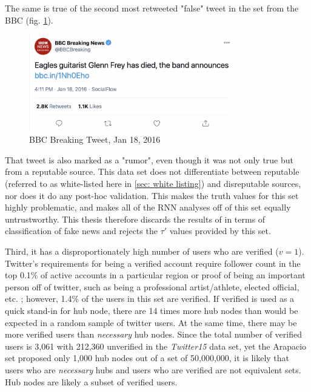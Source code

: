 \documentclass[preprint,review,12pt]{elsarticle}
\begin{document}
The same is true of the second most retweeted "false" tweet in the set from the BBC (fig. \ref{fig:BBC Breaking Tweet, Jan 18, 2016}).
\begin{figure}[h!]
    \centering
    \includegraphics[width=9cm]{BBC Eagles.png}
    \caption{BBC Breaking Tweet, Jan 18, 2016 \cite{bbc2016tweet}}
    \label{fig:BBC Breaking Tweet, Jan 18, 2016}
\end{figure}
That tweet is also marked as a "rumor", even though it was not only true but from a reputable source. This data set does not differentiate between reputable (referred to as white-listed here in \ref{sec: white listing}) and disreputable sources, nor does it do any post-hoc validation. This makes the truth values for this set highly problematic, and makes all of the RNN analyses off of this set equally untrustworthy. This thesis therefore discards the results of \citep{liu2018early,ma2017detect,ma2016detecting,khoo2020interpretable,liu2019early,huang2019deep} in terms of classification of fake news and rejects the $\tau'$ values provided by this set.

Third, it has a disproportionately high number of users who are verified ($v = 1$). Twitter's requirements for being a verified account require follower count in the top 0.1\% of active accounts in a particular region or proof of being an important person off of twitter, such as being a professional artist/athlete, elected official, etc. \citep{twitter2020verified}; however, 1.4\% of the users in this set are verified. If verified is used as a quick stand-in for hub node, there are 14 times more hub nodes than would be expected in a random sample of twitter users. At the same time, there may be more verified users than \textit{necessary} hub nodes. Since the total number of verified users is 3,061 with 212,360 unverified in the \textit{Twitter15} data set, yet the Arapacio set proposed only 1,000 hub nodes out of a set of 50,000,000, it is likely that users who are \textit{necessary} hubs and users who are verified are not equivalent sets. Hub nodes are likely a subset of verified users. 
\end{document}
